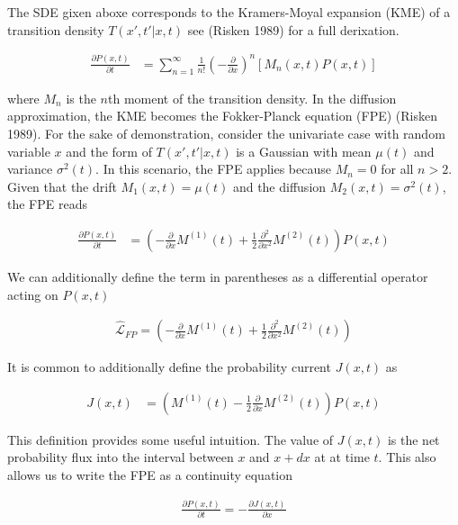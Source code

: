 \documentclass{ucetd}
\begin{document}
\begin{appendices}
The SDE gixen aboxe corresponds to the Kramers-Moyal expansion (KME) of a transition density $T(x',t'|x,t)$ see (Risken 1989) for a full derixation.

\begin{align}
\frac{\partial P(x,t)}{\partial t}  &= \sum_{n=1}^{\infty} \frac{1}{n!}\left(-\frac{\partial}{\partial x}\right)^{n} \left[M_{n}(x,t)P(x,t)\right]
\end{align}

where $M_{n}$ is the $n$th moment of the transition density. In the diffusion approximation, the KME becomes the Fokker-Planck equation (FPE) (Risken 1989). For the sake of demonstration, consider the univariate case with random variable $x$ and the form of $T(x',t'|x,t)$ is a Gaussian with mean $\mu(t)$ and variance $\sigma^{2}(t)$. In this scenario, the FPE applies because $M_{n} = 0$ for all $n > 2$. Given that the drift $M_{1}(x,t) = \mu(t)$ and the diffusion $M_{2}(x,t) = \sigma^{2}(t)$, the FPE reads

\begin{align}
\frac{\partial P(x,t)}{\partial t}  &= \left(-\frac{\partial}{\partial x}M^{(1)}(t) + \frac{1}{2}\frac{\partial^{2}}{\partial x^{2}}M^{(2)}(t)\right)P(x,t)
\end{align}

We can additionally define the term in parentheses as a differential operator acting on $P(x,t)$

\begin{align}
\hat{\mathcal{L}}_{FP} = \left(-\frac{\partial}{\partial x}M^{(1)}(t) + \frac{1}{2}\frac{\partial^{2}}{\partial x^{2}}M^{(2)}(t)\right)
\end{align}

It is common to additionally define the probability current $J(x,t)$ as 

\begin{align}
J(x,t)  &= \left(M^{(1)}(t) - \frac{1}{2}\frac{\partial}{\partial x}M^{(2)}(t)\right)P(x,t)
\end{align}

This definition provides some useful intuition. The value of $J(x,t)$ is the net probability flux into the interval between $x$ and $x+dx$ at at time $t$. This also allows us to write the FPE as a continuity equation

\begin{align}
\frac{\partial P(x,t)}{\partial t} = -\frac{\partial J(x,t)}{\partial x}
\end{align}
\end{appendices}
\end{document}
